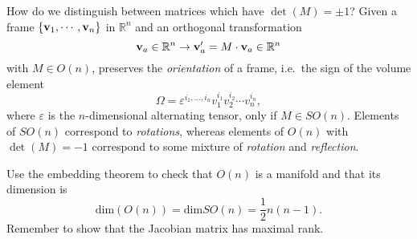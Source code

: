 How do we distinguish between matrices which have $\det(M) = \pm 1$?
Given a frame $\left\{ \vb{v}_1, \cdots, \vb{v}_n \right\}$ in $\mathbb{R}^n$ and an orthogonal transformation
\begin{equation}
  \vb{v}_a \in \mathbb{R}^n \to \vb{v}_a' = M \cdot \vb{v}_a \in \mathbb{R}^n
\end{equation}
with $M \in O(n)$, preserves the \emph{orientation} of a frame, i.e.~the sign of the volume element
\begin{equation}
  \Omega = \varepsilon^{i_1, \ldots, i_n} v_1^{i_1}v_2^{i_2} \cdots v_n^{i_n},
\end{equation}
where $\varepsilon$ is the $n$-dimensional alternating tensor, only if $M \in SO(n)$.
Elements of $SO(n)$ correspond to \emph{rotations}, whereas elements of $O(n)$ with $\det(M) = -1$ correspond to some mixture of \emph{rotation} and \emph{reflection}.

\begin{exercise}
  Use the embedding theorem to check that $O(n)$ is a manifold and that its dimension is
  \begin{equation}
    \text{dim}(O(n)) = \text{dim} SO(n) = \frac{1}{2}n(n-1).
  \end{equation}
  Remember to show that the Jacobian matrix has maximal rank.
\end{exercise}
